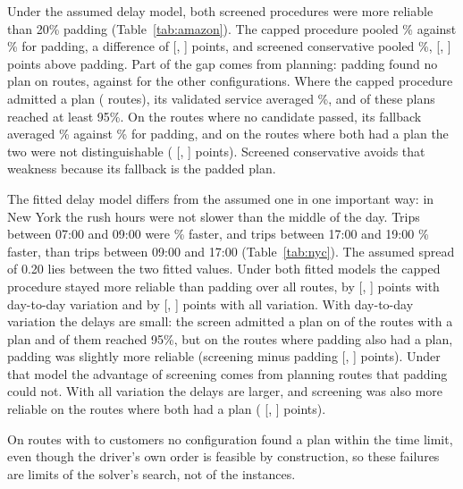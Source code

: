 \documentclass[12pt,letterpaper]{article}
\begin{document}
Under the assumed delay model, both screened procedures were more reliable than
20\% padding (Table~\ref{tab:amazon}). The capped procedure pooled \AmzCap\%
against \AmzCons\% for padding, a difference of \AmzCapDiff{} [\AmzCapDiffLo,
\AmzCapDiffHi] points, and screened conservative pooled \AmzSc\%, \AmzScDiff{}
[\AmzScDiffLo, \AmzScDiffHi] points above padding. Part of the gap comes from
planning: padding found no plan on \AmzConsNoPlan{} routes, against \AmzNoPlan{} for
the other configurations. Where the capped procedure admitted a plan
(\AmzCapAdmitted{} routes), its validated service averaged \AmzCapOnAdmitted\%, and
\AmzCapAdmittedNinetyFive{} of these plans reached at least 95\%. On the
\AmzFallbackRoutes{} routes where no candidate passed, its fallback averaged
\AmzCapOnFallback\% against \AmzConsOnFallback\% for padding, and on the
\AmzBoth{} routes where both had a plan the two were not distinguishable
(\AmzBothDiff{} [\AmzBothDiffLo, \AmzBothDiffHi] points). Screened conservative
avoids that weakness because its fallback is the padded plan.

The fitted delay model differs from the assumed one in one important way: in New
York the rush hours were not slower than the middle of the day. Trips between
07:00 and 09:00 were \NycAmFaster\% faster, and trips between 17:00 and 19:00
\NycPmFaster\% faster, than trips between 09:00 and 17:00 (Table~\ref{tab:nyc}). The
assumed spread of 0.20 lies between the two fitted values. Under both fitted models
the capped procedure stayed more reliable than padding over all routes, by
\AmzDCapDiff{} [\AmzDCapDiffLo, \AmzDCapDiffHi] points with day-to-day variation
and by \AmzTCapDiff{} [\AmzTCapDiffLo, \AmzTCapDiffHi] points with all variation.
With day-to-day variation the delays are small: the screen admitted a plan on
\AmzDCapAdmitted{} of the \AmzNomPlans{} routes with a plan and
\AmzDCapAdmittedNinetyFive{} of them reached 95\%, but on the \AmzDBoth{} routes
where padding also had a plan, padding was slightly more reliable (screening minus
padding \AmzDBothDiff{} [\AmzDBothDiffLo, \AmzDBothDiffHi] points). Under that
model the advantage of screening comes from planning routes that padding could
not. With all variation the delays are larger, and screening was also more
reliable on the routes where both had a plan (\AmzTBothDiff{} [\AmzTBothDiffLo,
\AmzTBothDiffHi] points).

On \AmzNoPlan{} routes with \AmzNoPlanCustMin{} to \AmzNoPlanCustMax{} customers no
configuration found a plan within the time limit, even though the driver's own
order is feasible by construction, so these failures are limits of the solver's
search, not of the instances.
\end{document}
